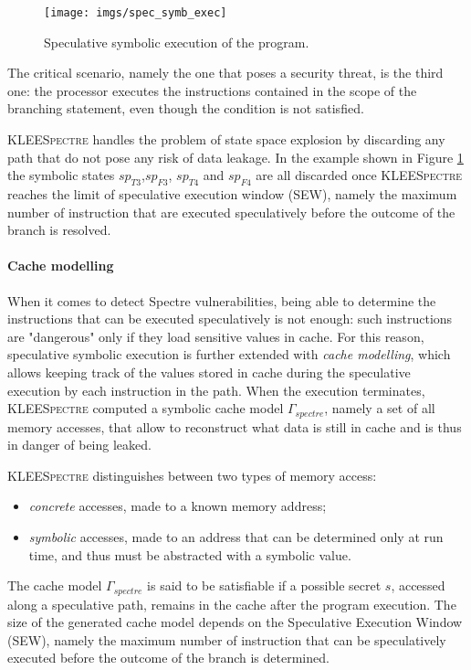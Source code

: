 \documentclass[target=mst,aauheader=aics]{thud}
\theoremstyle{definition}
\begin{document}
	\begin{figure}
		\centering
		\texttt{[image: imgs/spec\_symb\_exec]}
		\caption{Speculative symbolic execution of the program.}
		\label{fig:spec_symb_exec}
	\end{figure}
	
	The critical scenario, namely the one that poses a security threat, is the third one: the processor executes the instructions contained in the scope of the branching statement, even though the condition is not satisfied. 
	
	\textsc{KLEESpectre} handles the problem of state space explosion by discarding any path that do not pose any risk of data leakage. In the example shown in Figure \ref{fig:spec_symb_exec} the symbolic states $sp_{T3}$,$sp_{F3}$, $sp_{T4}$ and $sp_{F4}$ are all discarded once \textsc{KLEESpectre} reaches the limit of speculative execution window (SEW), namely the maximum number of instruction that are executed speculatively before the outcome of the branch is resolved. 
	\paragraph{Cache modelling} 
	When it comes to detect Spectre vulnerabilities, being able to determine the instructions that can be executed speculatively is not enough: such instructions are "dangerous" only if they load sensitive values in cache. For this reason, speculative symbolic execution is further extended with \textit{cache modelling}, which allows keeping track of the values stored in cache during the speculative execution by each instruction in the path. When the execution terminates, \textsc{KLEESpectre} computed a symbolic cache model $\Gamma_{spectre}$, namely a set of all memory accesses, that allow to reconstruct what data is still in cache and is thus in danger of being leaked.
	
	\textsc{KLEESpectre} distinguishes between two types of memory access:
	\begin{itemize}
		\item \textit{concrete} accesses, made to a known memory address;
		\item \textit{symbolic} accesses, made to an address that can be determined only at run time, and thus must be abstracted with a symbolic value. 
	\end{itemize}
	The cache model $\Gamma_{spectre}$ is said to be satisfiable if a possible secret $s$, accessed along a speculative path, remains in the cache after the program execution. The size of the generated cache model depends on the Speculative Execution Window (SEW), namely the maximum number of instruction that can be speculatively executed before the outcome of the branch is determined.
	
\end{document}
